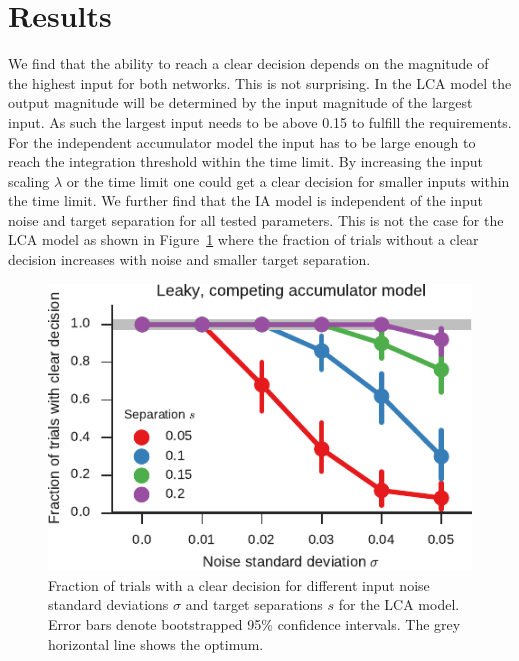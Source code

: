\documentclass[10pt,letterpaper]{article}
\begin{document}
\section{Results}
We find that the ability to reach a clear decision depends on the magnitude of 
the highest input for both networks. This is not surprising. In the LCA model 
the output magnitude will be determined by the input magnitude of the largest 
input.  As such the largest input needs to be above 0.15 to fulfill the 
requirements. For the independent accumulator model the input has to be large 
enough to reach the integration threshold within the time limit. By increasing 
the input scaling $\lambda$ or the time limit one could get a clear decision for 
smaller inputs within the time limit. We further find that the IA model is 
independent of the input noise and target separation for all tested parameters.  
This is not the case for the LCA model as shown in Figure~\ref{fig:decisions} 
where the fraction of trials without a clear decision increases with noise and 
smaller target separation.
\begin{figure}
    \centering
    \includegraphics{figures/decisions}
    \caption{Fraction of trials with a clear decision for different input noise 
        standard deviations $\sigma$ and target separations $s$ for the LCA 
        model. Error bars denote bootstrapped 95\% confidence intervals.  The 
        grey horizontal line shows the optimum.}\label{fig:decisions}
\end{figure}
\end{document}
